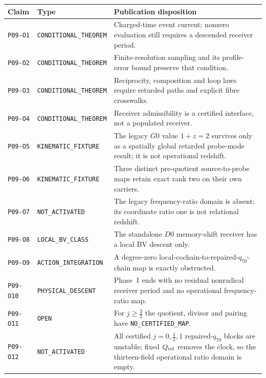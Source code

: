 \documentclass[11pt]{article}
\begin{document}
\begin{center}
\footnotesize
\begin{tabularx}{\textwidth}{
  >{\raggedright\arraybackslash}p{}
  >{\raggedright\arraybackslash}p{}
  >{\raggedright\arraybackslash}X}
\toprule
Claim & Type & Publication disposition \\
\midrule
\texttt{P09-O1} & \texttt{CONDITIONAL\_THEOREM} & Charged-time event current; nonzero evaluation still requires a descended receiver period. \\
\texttt{P09-O2} & \texttt{CONDITIONAL\_THEOREM} & Finite-resolution sampling and its profile-error bound preserve that condition. \\
\texttt{P09-O3} & \texttt{CONDITIONAL\_THEOREM} & Reciprocity, composition and loop laws require retarded paths and explicit fibre crosswalks. \\
\texttt{P09-O4} & \texttt{CONDITIONAL\_THEOREM} & Receiver admissibility is a certified interface, not a populated receiver. \\
\texttt{P09-O5} & \texttt{KINEMATIC\_FIXTURE} & The legacy $G0$ value $1+z=2$ survives only as a spatially global retarded probe-mode result; it is not operational redshift. \\
\texttt{P09-O6} & \texttt{KINEMATIC\_FIXTURE} & Three distinct pre-quotient source-to-probe maps retain exact rank two on their own carriers. \\
\texttt{P09-O7} & \texttt{NOT\_ACTIVATED} & The legacy frequency-ratio domain is absent; its coordinate ratio one is not relational redshift. \\
\texttt{P09-O8} & \texttt{LOCAL\_BV\_CLASS} & The standalone $D0$ memory-shift receiver has a local BV descent only. \\
\texttt{P09-O9} & \texttt{ACTION\_INTEGRATION} & A degree-zero local-cochain-to-repaired-$q_{70}$-chain map is exactly obstructed. \\
\texttt{P09-O10} & \texttt{PHYSICAL\_DESCENT} & Phase~1 ends with no residual nonradical receiver period and no operational frequency-ratio map. \\
\texttt{P09-O11} & \texttt{OPEN} & For $j\geq\frac32$ the quotient, divisor and pairing have \texttt{NO\_CERTIFIED\_MAP}. \\
\texttt{P09-O12} & \texttt{NOT\_ACTIVATED} & All certified $j=0,\frac12,1$ repaired-$q_{70}$ blocks are unstable; fixed $Q_{\rm rel}$ removes the clock, so the thirteen-field operational ratio domain is empty. \\
\bottomrule
\end{tabularx}
\end{center}
\end{document}

